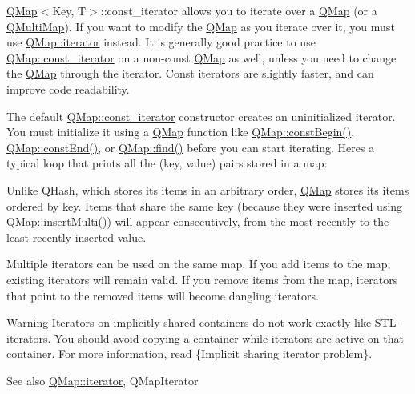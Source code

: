 \hyperlink{class_q_map}{Q\+Map}$<$Key, T$>$\+::const\+\_\+iterator allows you to iterate over a \hyperlink{class_q_map}{Q\+Map} (or a \hyperlink{class_q_multi_map}{Q\+Multi\+Map}). If you want to modify the \hyperlink{class_q_map}{Q\+Map} as you iterate over it, you must use \hyperlink{class_q_map_1_1iterator}{Q\+Map\+::iterator} instead. It is generally good practice to use \hyperlink{class_q_map_1_1const__iterator}{Q\+Map\+::const\+\_\+iterator} on a non-\/const \hyperlink{class_q_map}{Q\+Map} as well, unless you need to change the \hyperlink{class_q_map}{Q\+Map} through the iterator. Const iterators are slightly faster, and can improve code readability.

The default \hyperlink{class_q_map_1_1const__iterator}{Q\+Map\+::const\+\_\+iterator} constructor creates an uninitialized iterator. You must initialize it using a \hyperlink{class_q_map}{Q\+Map} function like \hyperlink{class_q_map_ab55b01ac2790d09ceff0b911474a8b43}{Q\+Map\+::const\+Begin()}, \hyperlink{class_q_map_a6307f2d58e928bb15019024150f0afcb}{Q\+Map\+::const\+End()}, or \hyperlink{class_q_map_a8cf44b635018eb178cc724ed20379d85}{Q\+Map\+::find()} before you can start iterating. Here\textquotesingle{}s a typical loop that prints all the (key, value) pairs stored in a map\+:


\begin{DoxyCodeInclude}
\end{DoxyCodeInclude}
 Unlike Q\+Hash, which stores its items in an arbitrary order, \hyperlink{class_q_map}{Q\+Map} stores its items ordered by key. Items that share the same key (because they were inserted using \hyperlink{class_q_map_a075634da2cf912a20dd1c4a5835acfa3}{Q\+Map\+::insert\+Multi()}) will appear consecutively, from the most recently to the least recently inserted value.

Multiple iterators can be used on the same map. If you add items to the map, existing iterators will remain valid. If you remove items from the map, iterators that point to the removed items will become dangling iterators.

\begin{DoxyWarning}{Warning}
Iterators on implicitly shared containers do not work exactly like S\+T\+L-\/iterators. You should avoid copying a container while iterators are active on that container. For more information, read \{Implicit sharing iterator problem\}.
\end{DoxyWarning}
\begin{DoxySeeAlso}{See also}
\hyperlink{class_q_map_1_1iterator}{Q\+Map\+::iterator}, Q\+Map\+Iterator 
\end{DoxySeeAlso}


